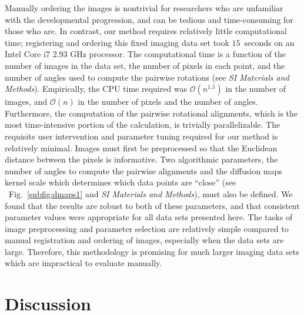 \documentclass{pnastwo}
\newcommand{\SI}[0]{{\it SI Materials and Methods}}
\newcommand{\fig}[0]{Fig.}
\begin{document}
\begin{article}
Manually ordering the images is nontrivial for researchers who are unfamiliar with the developmental progression, and can be tedious and time-consuming for those who are.
%
In contrast, our method requires relatively little computational time; registering and ordering this fixed imaging data set took $15$~seconds on an Intel Core i7 2.93 GHz processor. %
%
The computational time is a function of the number of images in the data set, the number of pixels in each point, and the number of angles used to compute the pairwise rotations (see \SI). 
%
Empirically, the CPU time required was $\mathcal{O}(n^{1.5})$ in the number of images, and $\mathcal{O}(n)$ in the number of pixels and the number of angles.
%
Furthermore, the computation of the pairwise rotational alignments, which is the most time-intensive portion of the calculation, is trivially parallelizable.
%
The requisite user intervention and parameter tuning required for our method is relatively minimal.
%
Images must first be preprocessed so that the Euclidean distance between the pixels is informative.
%
Two algorithmic parameters, the number of angles to compute the pairwise alignments and the diffusion maps kernel scale which determines which data points are ``close'' (see ~\fig~\ref{subfig:dmaps1} and \SI), must also be defined.
%
We found that the results are robust to both of these parameters, and that consistent parameter values were appropriate for all data sets presented here. 
%
%
The tasks of image preprocessing and parameter selection are relatively simple compared to manual registration and ordering of images, especially when the data sets are large.  
%
Therefore, this methodology is promising for much larger imaging data sets which are impractical to evaluate manually. 


\section{Discussion}


\end{article}
\end{document}

